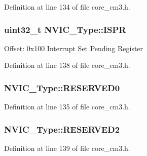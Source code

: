 Definition at line 134 of file core\+\_\+cm3.\+h.

\subsubsection[{\texorpdfstring{I\+S\+PR}{ISPR}}]{ {\bf uint32\+\_\+t} N\+V\+I\+C\+\_\+\+Type\+::\+I\+S\+PR}\hypertarget{struct_n_v_i_c___type_ab7aef74794b43a7df880e19ed50b6257}{}\label{struct_n_v_i_c___type_ab7aef74794b43a7df880e19ed50b6257}
Offset\+: 0x100 Interrupt Set Pending Register 

Definition at line 138 of file core\+\_\+cm3.\+h.

\subsubsection[{\texorpdfstring{R\+E\+S\+E\+R\+V\+E\+D0}{RESERVED0}}]{ N\+V\+I\+C\+\_\+\+Type\+::\+R\+E\+S\+E\+R\+V\+E\+D0}\hypertarget{struct_n_v_i_c___type_abf174b542f11f026eabdc8a74c93ab6e}{}\label{struct_n_v_i_c___type_abf174b542f11f026eabdc8a74c93ab6e}


Definition at line 135 of file core\+\_\+cm3.\+h.

\subsubsection[{\texorpdfstring{R\+E\+S\+E\+R\+V\+E\+D2}{RESERVED2}}]{ N\+V\+I\+C\+\_\+\+Type\+::\+R\+E\+S\+E\+R\+V\+E\+D2}\hypertarget{struct_n_v_i_c___type_a8e5857c94d765a0855eeec1e6bec1006}{}\label{struct_n_v_i_c___type_a8e5857c94d765a0855eeec1e6bec1006}


Definition at line 139 of file core\+\_\+cm3.\+h.

